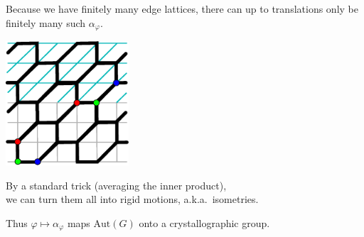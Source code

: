 \documentclass{beamer}
\begin{document}
\begin{frame}
  \begin{center}
    Because we have finitely many edge lattices, there can up to translations
    only be finitely many such $\alpha_\varphi$.

    \includegraphics[width=1.8in]{affine}

    By a standard trick (averaging the inner product),\\
    we can turn them all into rigid motions, a.k.a.\ isometries.

    Thus $\varphi \mapsto \alpha_\varphi$ maps $\mathrm{Aut}(G)$ onto a
    crystallographic group.
  \end{center}
\end{frame}
\end{document}
